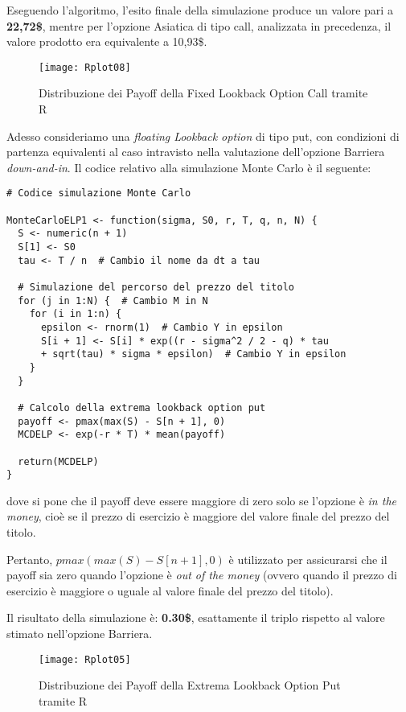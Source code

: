 \documentclass[12pt,a4paper]{report}
\begin{document}
Eseguendo l'algoritmo, l'esito finale della simulazione produce un valore pari a \textbf{22,72\$}, mentre per l'opzione Asiatica di tipo call, analizzata in precedenza, il valore prodotto era equivalente a 10,93\$. 

\begin{figure}
     [ht]
    \centering
    \texttt{[image: Rplot08]}
    \caption{Distribuzione dei Payoff della Fixed Lookback Option Call tramite R}
    \label{fig:enter-label11342}
\end{figure}


Adesso consideriamo una \textit{floating Lookback option} di tipo put, con condizioni di partenza equivalenti al caso intravisto nella valutazione dell'opzione Barriera \textit{down-and-in}. Il codice relativo alla simulazione Monte Carlo è il seguente:

\begin{verbatim}
# Codice simulazione Monte Carlo

MonteCarloELP1 <- function(sigma, S0, r, T, q, n, N) {
  S <- numeric(n + 1)
  S[1] <- S0
  tau <- T / n  # Cambio il nome da dt a tau
  
  # Simulazione del percorso del prezzo del titolo
  for (j in 1:N) {  # Cambio M in N
    for (i in 1:n) {
      epsilon <- rnorm(1)  # Cambio Y in epsilon
      S[i + 1] <- S[i] * exp((r - sigma^2 / 2 - q) * tau 
      + sqrt(tau) * sigma * epsilon)  # Cambio Y in epsilon
    }
  }
  
  # Calcolo della extrema lookback option put
  payoff <- pmax(max(S) - S[n + 1], 0)
  MCDELP <- exp(-r * T) * mean(payoff)
  
  return(MCDELP)
}
\end{verbatim}

dove si pone che il payoff deve essere maggiore di zero solo se l'opzione è \textit{in the money}, cioè se il prezzo di esercizio è maggiore del valore finale del prezzo del titolo. 

Pertanto, $pmax(max(S) - S[n + 1], 0)$ è utilizzato per assicurarsi che il payoff sia zero quando l'opzione è \textit{out of the money} (ovvero quando il prezzo di esercizio è maggiore o uguale al valore finale del prezzo del titolo).

Il risultato della simulazione è: \textbf{0.30\$}, esattamente il triplo rispetto al valore stimato nell'opzione Barriera.


\begin{figure}
     [ht]
    \centering
    \texttt{[image: Rplot05]}
    \caption{Distribuzione dei Payoff della Extrema Lookback Option Put tramite R}
    \label{fig:enter-label1142}
\end{figure}
\end{document}
